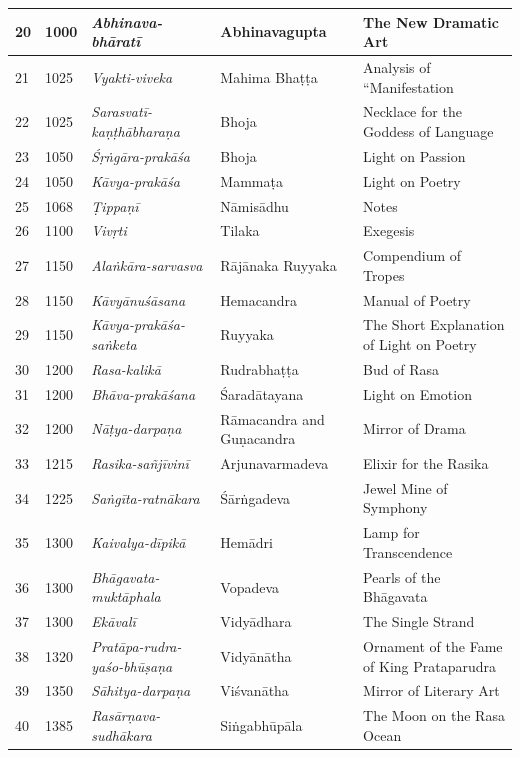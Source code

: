 \begin{longtable}{|l|p{1.1cm}|p{1.98cm}|p{1.98cm}|p{1.98cm}|}
\hline
20 & 1000 & \textit{Abhinava-bhāratī} & Abhinavagupta & The New Dramatic Art \\
\hline
21 & 1025 & \textit{Vyakti-viveka} & Mahima Bhaṭṭa & Analysis of “Manifestation \\
\hline
22 & 1025 & \textit{Sarasvatī-kaṇṭhābharaṇa} & Bhoja & Necklace for the Goddess of Language \\
\hline
23 & 1050 & \textit{Śṛṅgāra-prakāśa} & Bhoja & Light on Passion \\
\hline
24 & 1050 & \textit{Kāvya-prakāśa} & Mammaṭa & Light on Poetry \\
\hline
25 & 1068 & \textit{Ṭippaṇī} & Nāmisādhu & Notes \\
\hline
26 & 1100 & \textit{Vivṛti} & Tilaka & Exegesis \\
\hline
27 & 1150 & \textit{Alaṅkāra-sarvasva} & Rājānaka Ruyyaka & Compendium of Tropes \\
\hline
28 & 1150 & \textit{Kāvyānuśāsana} & Hemacandra & Manual of Poetry \\
\hline
29 & 1150 & \textit{Kāvya-prakāśa-saṅketa} & Ruyyaka & The Short Explanation of Light on Poetry \\
\hline
30 & 1200 & \textit{Rasa-kalikā} & Rudrabhaṭṭa & Bud of Rasa \\
\hline
31 & 1200 & \textit{Bhāva-prakāśana} & Śaradātayana & Light on Emotion \\
\hline
32 & 1200 & \textit{Nāṭya-darpaṇa} & Rāmacandra and Guṇacandra & Mirror of Drama \\
\hline
33 & 1215 & \textit{Rasika-sañjīvinī} & Arjunavarma\-deva & Elixir for the Rasika \\
\hline
34 & 1225 & \textit{Saṅgīta-ratnākara} & Śārṅgadeva & Jewel Mine of Symphony \\
\hline
35 & 1300 & \textit{Kaivalya-dīpikā} & Hemādri & Lamp for Transcendence \\
\hline
36 & 1300 & \textit{Bhāgavata-muktāphala} & Vopadeva & Pearls of the Bhāgavata \\
\hline
37 & 1300 & \textit{Ekāvalī} & Vidyādhara & The Single Strand \\
\hline
38 & 1320 & \textit{Pratāpa-rudra-yaśo-bhūṣaṇa} & Vidyānātha & Ornament of the Fame of King Prataparudra \\
\hline
39 & 1350 & \textit{Sāhitya-darpaṇa} & Viśvanātha & Mirror of Literary Art \\
\hline
40 & 1385 & \textit{Rasārṇava-sudhākara} & Siṅgabhūpāla & The Moon on the Rasa Ocean \\

\end{longtable}
